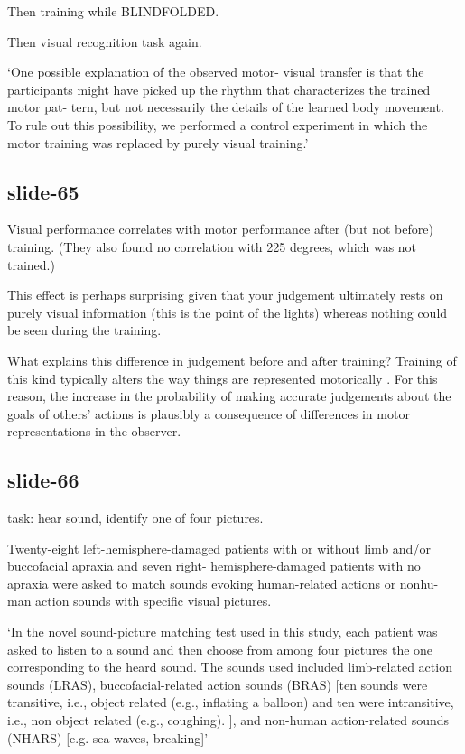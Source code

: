 \documentclass[12pt,\papersize]{extarticle}
\begin{document}
Then training while BLINDFOLDED.

Then visual recognition task again.

‘One possible explanation of the observed motor- visual transfer is that the participants might have
picked up the rhythm that characterizes the trained motor pat- tern, but not necessarily the details
of the learned body movement. To rule out this possibility, we performed a control experiment in
which the motor training was replaced by purely visual training.’

\subsection{slide-65}
Visual performance correlates with motor performance after (but not before) training.
(They also found no correlation with 225 degrees, which was not trained.)

This effect is perhaps surprising given that your judgement ultimately rests on purely visual
information (this is the point of the lights) whereas nothing could be seen during the training.

What explains this difference in judgement before and after training?  Training of this kind typically alters the way things are represented motorically \citep{Calvo-Merino:2006ru}.
\label{expertise_affects_motor}
For this reason, the increase in the probability of making accurate judgements about the goals of others' actions is plausibly a consequence of differences in motor representations in the observer.

\subsection{slide-66}
task: hear sound, identify one of four pictures.

Twenty-eight left-hemisphere-damaged patients with or without limb and/or buccofacial apraxia and
seven right- hemisphere-damaged patients with no apraxia were asked to match sounds evoking
human-related actions or nonhu- man action sounds with specific visual pictures.

‘In the novel sound-picture matching test used in this study, each patient was asked to listen to a
sound and then choose from among four pictures the one corresponding to the heard sound. The sounds
used included limb-related action sounds (LRAS), buccofacial-related action sounds (BRAS)
[ten sounds were transitive, i.e., object related (e.g., inflating a balloon) and ten were
intransitive, i.e., non object related (e.g., coughing). ], and non-human action-related sounds
(NHARS) [e.g. sea waves, breaking]’
\end{document}
